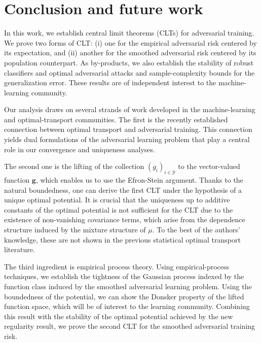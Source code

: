 \documentclass{amsart}
\theoremstyle{plain}
\numberwithin{equation}{section}\newtheorem{theorem}{Theorem}[section]
\theoremstyle{remark}
\begin{document}
\section{Conclusion and future work}
In this work, we establish central limit theorems (CLTs) for adversarial training. We prove two forms of CLT: (i) one for the empirical adversarial risk centered by its expectation, and (ii) another for the smoothed adversarial risk centered by its population counterpart. As by-products, we also establish the stability of robust classifiers and optimal adversarial attacks and sample-complexity bounds for the generalization error. These results are of independent interest to the machine-learning community.

Our analysis draws on several strands of work developed in the machine-learning and optimal-transport communities. The first is the recently established connection between optimal transport and adversarial training. This connection yields dual formulations of the adversarial learning problem that play a central role in our convergence and uniqueness analyses.



The second one is the lifting of the collection $(g_i)_{i \in \mathcal{Y}}$ to the vector-valued function $\bm{g}$, which enables us to use the Efron-Stein argument. Thanks to the natural boundedness, one can derive the first CLT under the hypothesis of a unique optimal potential. It is crucial that the uniqueness up to additive constants of the optimal potential is not sufficient for the CLT due to the existence of non-vanishing covariance terms, which arise from the dependence structure
induced by the mixture structure of $\mu$. To the best of the authors' knowledge, these are not shown in the previous statistical optimal transport literature. 



The third ingredient is empirical process theory. Using empirical-process techniques, we establish the tightness of the Gaussian process indexed by the function class induced by the smoothed adversarial learning problem. Using the boundedness of the potential, we can show the Donsker property of the lifted function space, which will be of interest to the learning community. Combining this result with the stability of the optimal potential achieved by the new regularity result, we prove the second CLT for the smoothed adversarial training risk.
\end{document}
